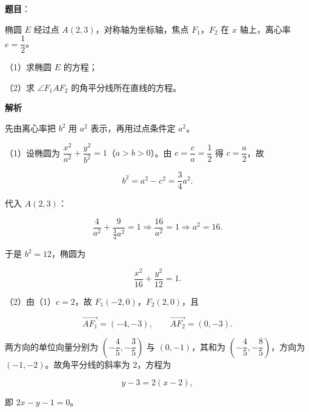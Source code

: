 \begin{answer}

\textbf{题目}：

椭圆 $E$ 经过点 $A(2,3)$，对称轴为坐标轴，焦点 $F_1$，$F_2$ 在 $x$ 轴上，离心率 $e=\dfrac12$。

（1）求椭圆 $E$ 的方程；

（2）求 $\angle F_1AF_2$ 的角平分线所在直线的方程。
\nopagebreak[4]
\begin{center}\end{center}
\nopagebreak[4]
\textbf{解析}

先由离心率把 $b^2$ 用 $a^2$ 表示，再用过点条件定 $a^2$。

（1）设椭圆为 $\dfrac{x^2}{a^2}+\dfrac{y^2}{b^2}=1$（$a>b>0$）。由 $e=\dfrac ca=\dfrac12$ 得 $c=\dfrac a2$，故

\nopagebreak[4]
\[b^2=a^2-c^2=\frac34a^2.\]

代入 $A(2,3)$：

\nopagebreak[4]
\[\frac4{a^2}+\frac9{\frac34a^2}=1
\Longrightarrow \frac{16}{a^2}=1
\Longrightarrow a^2=16.\]

于是 $b^2=12$，椭圆为

\nopagebreak[4]
\[\frac{x^2}{16}+\frac{y^2}{12}=1.\]

（2）由（1）$c=2$，故 $F_1(-2,0)$，$F_2(2,0)$，且

\nopagebreak[4]
\[\overrightarrow{AF_1}=(-4,-3),\qquad \overrightarrow{AF_2}=(0,-3).\]

两方向的单位向量分别为 $\left(-\dfrac45,-\dfrac35\right)$ 与 $(0,-1)$，其和为 $\left(-\dfrac45,-\dfrac85\right)$，方向为 $(-1,-2)$。故角平分线的斜率为 $2$，方程为

\nopagebreak[4]
\[y-3=2(x-2),\]

即 $2x-y-1=0$。


\end{answer}
